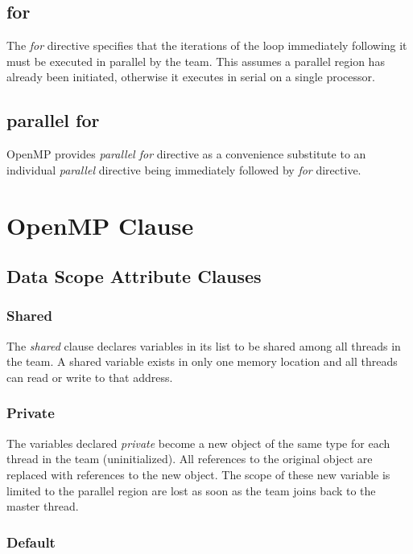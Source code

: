 \documentclass[a4paper, 10pt, conference]{IEEEtran}      %
\begin{document}
	\subsection {for}
	The \textit{for} directive specifies that the iterations of the loop immediately following it must be executed in parallel by the team. This assumes a parallel region has already been initiated, otherwise it executes in serial on a single processor.
	
	\subsection{parallel for}
	OpenMP provides \textit{parallel for} directive as a convenience substitute to an individual \textit{parallel} directive being immediately followed by \textit{for} directive.
	
	\section {OpenMP Clause}
	
	\subsection{Data Scope Attribute Clauses}
	\subsubsection{Shared}
	The \textit{shared} clause declares variables in its list to be shared among all threads in the team. A shared variable exists in only one memory location and all threads can read or write to that address.\\
	
	\subsubsection{Private}
	The variables declared \textit{private} become a new object of the same type for each thread in the team (uninitialized). All references to the original object are replaced with references to the new object. The scope of these new variable is limited to the parallel region are lost as soon as the team  joins back to the master thread.\\
	
	\subsubsection{Default}
	
\end{document}
